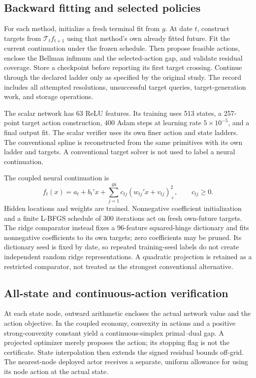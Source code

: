 \documentclass[ecta,nameyear,draft]{econsocart}
\begin{document}
\subsection{Backward fitting and selected policies}
For each method, initialize a fresh terminal fit from $g$. At date $t$, construct targets from $\mathcal T_tf_{t+1}$ using that method's own already fitted future. Fit the current continuation under the frozen schedule. Then propose feasible actions, enclose the Bellman infimum and the selected-action gap, and validate residual coverage. Store a checkpoint before reporting its first target crossing. Continue through the declared ladder only as specified by the original study. The record includes all attempted resolutions, unsuccessful target queries, target-generation work, and storage operations.

The scalar network has 63 ReLU features. Its training uses 513 states, a 257-point target action construction, 400 Adam steps at learning rate $5\times10^{-5}$, and a final output fit. The scalar verifier uses its own finer action and state ladders. The conventional spline is reconstructed from the same primitives with its own ladder and targets. A conventional target solver is not used to label a neural continuation.

The coupled neural continuation is
\begin{equation}\label{eq:network}
 f_t(x)=a_t+b_t'x+\sum_{j=1}^{48}c_{tj}(w_{tj}'x+v_{tj})_+^2,
 \qquad c_{tj}\geq0.
\end{equation}
Hidden locations and weights are trained. Nonnegative coefficient initialization and a finite L-BFGS schedule of 300 iterations act on fresh own-future targets. The ridge comparator instead fixes a 96-feature squared-hinge dictionary and fits nonnegative coefficients to its own targets; zero coefficients may be pruned. Its dictionary seed is fixed by date, so repeated training-seed labels do not create independent random ridge representations. A quadratic projection is retained as a restricted comparator, not treated as the strongest conventional alternative.

\subsection{All-state and continuous-action verification}
At each state node, outward arithmetic encloses the actual network value and the action objective. In the coupled economy, convexity in actions and a positive strong-convexity constant yield a continuous-simplex primal--dual gap. A projected optimizer merely proposes the action; its stopping flag is not the certificate. State interpolation then extends the signed residual bounds off-grid. The nearest-node deployed actor receives a separate, uniform allowance for using its node action at the actual state.
\end{document}

